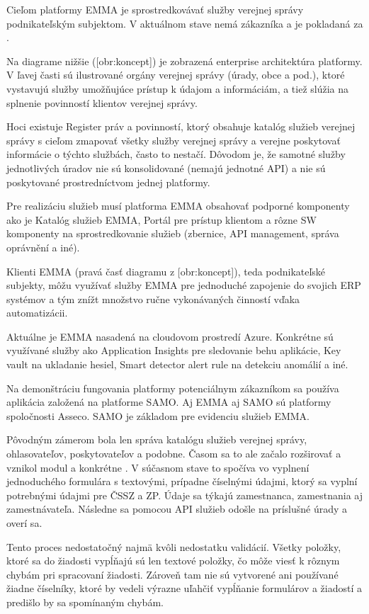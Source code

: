 Cieľom platformy EMMA je sprostredkovávať služby verejnej správy podnikateľským subjektom. V aktuálnom stave nemá zákazníka a je pokladaná za .

Na diagrame nižšie ([obr:koncept]) je zobrazená enterprise architektúra platformy. V ľavej časti sú ilustrované orgány verejnej správy (úrady, obce a pod.), ktoré vystavujú služby umožňujúce prístup k údajom a informáciám, a tiež slúžia na splnenie povinností klientov verejnej správy.

Hoci existuje Register práv a povinností, ktorý obsahuje katalóg služieb verejnej správy s cieľom zmapovať všetky služby verejnej správy a verejne poskytovať informácie o týchto službách, často to nestačí. Dôvodom je, že samotné služby jednotlivých úradov nie sú konsolidované (nemajú jednotné API) a nie sú poskytované prostredníctvom jednej platformy.

Pre realizáciu služieb musí platforma EMMA obsahovať podporné komponenty ako je Katalóg služieb EMMA, Portál pre prístup klientom a rôzne SW komponenty na sprostredkovanie služieb (zbernice, API management, správa oprávnění a iné). 

Klienti EMMA (pravá časť diagramu z [obr:koncept]), teda podnikateľské subjekty, môžu využívať služby EMMA pre jednoduché zapojenie do svojich ERP systémov a tým znížt množstvo ručne vykonávaných činností vďaka automatizácii.

Aktuálne je EMMA nasadená na cloudovom prostredí Azure. Konkrétne sú využívané služby ako Application Insights pre sledovanie behu aplikácie, Key vault na ukladanie hesiel, Smart detector alert rule na detekciu anomálií a iné. 

Na demonštráciu fungovania platformy potenciálnym zákazníkom sa používa aplikácia založená na platforme SAMO. Aj EMMA aj SAMO sú platformy spoločnosti Asseco. SAMO je základom pre evidenciu služieb EMMA.

Pôvodným zámerom bola len správa katalógu služieb verejnej správy, ohlasovateľov, poskytovateľov a podobne. Časom sa to ale začalo rozširovať a vznikol modul  a konkrétne . V súčasnom stave to spočíva vo vyplnení jednoduchého formulára s textovými, prípadne číselnými údajmi, ktorý sa vyplní potrebnými údajmi pre ČSSZ a ZP. Údaje sa týkajú zamestnanca, zamestnania aj zamestnávateľa. Následne sa pomocou API služieb odošle na príslušné úrady a overí sa.

Tento proces nedostatočný najmä kvôli nedostatku validácií. Všetky položky, ktoré sa do žiadosti vypĺňajú sú len textové položky, čo môže viesť k rôznym chybám pri spracovaní žiadosti. Zároveň tam nie sú vytvorené ani používané žiadne číselníky, ktoré by vedeli výrazne uľahčiť vypĺňanie formulárov a žiadostí a predišlo by sa spomínaným chybám.

